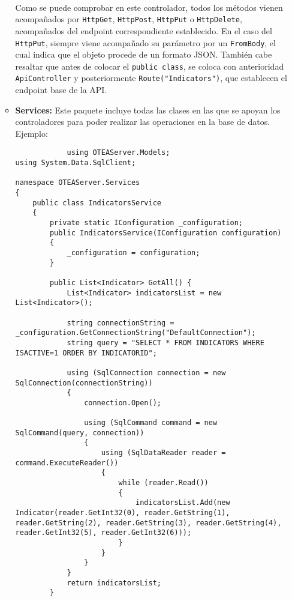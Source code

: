 \begin{itemize}
\begin{itemize}
\begin{lstlisting}
            
        \end{lstlisting}
        Como se puede comprobar en este controlador, todos los métodos vienen
        acompañados por \texttt{HttpGet}, \texttt{HttpPost}, \texttt{HttpPut} o
        \texttt{HttpDelete}, acompañados del endpoint correspondiente
        establecido. En el caso del \texttt{HttpPut}, siempre viene acompañado
        su parámetro por un \texttt{FromBody}, el cual indica que el objeto
        procede de un formato JSON. También cabe resaltar que antes de colocar
        el \texttt{public class}, se coloca con anterioridad
        \texttt{ApiController} y posteriormente \texttt{Route("Indicators")},
        que establecen el endpoint base de la API.
        \item \textbf{Services: }Este paquete incluye todas las clases en las que se apoyan los controladores para poder realizar las operaciones en la base de datos. Ejemplo: 
        \begin{lstlisting}
            using OTEAServer.Models;
using System.Data.SqlClient;

namespace OTEAServer.Services
{
    public class IndicatorsService
    {
        private static IConfiguration _configuration;
        public IndicatorsService(IConfiguration configuration)
        {
            _configuration = configuration;
        }

        public List<Indicator> GetAll() {
            List<Indicator> indicatorsList = new List<Indicator>();

            string connectionString = _configuration.GetConnectionString("DefaultConnection");
            string query = "SELECT * FROM INDICATORS WHERE ISACTIVE=1 ORDER BY INDICATORID";

            using (SqlConnection connection = new SqlConnection(connectionString))
            {
                connection.Open();

                using (SqlCommand command = new SqlCommand(query, connection))
                {
                    using (SqlDataReader reader = command.ExecuteReader())
                    {
                        while (reader.Read())
                        {
                            indicatorsList.Add(new Indicator(reader.GetInt32(0), reader.GetString(1), reader.GetString(2), reader.GetString(3), reader.GetString(4), reader.GetInt32(5), reader.GetInt32(6)));
                        }
                    }
                }
            }
            return indicatorsList;
        }


\end{lstlisting}
\end{itemize}
\end{itemize}
